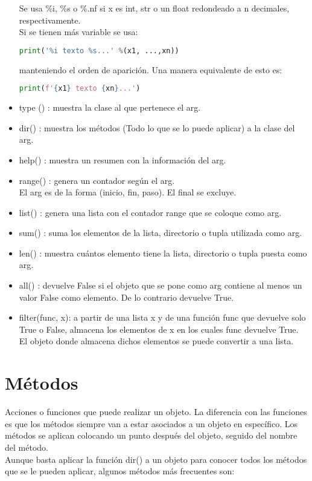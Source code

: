 \documentclass[10pt,oneside]{article}
\begin{document}
\begin{multicols}{2}
\begin{itemize}
                Se usa \%i, \%s o \%.nf si x es int, str o un float redondeado a n decimales, respectivamente.\\ \newline Si se tienen más variable se usa:
                
                \begin{lstlisting}[language=Python]
print('%i texto %s...' %(x1, ...,xn))   
                \end{lstlisting}
                
                manteniendo el orden de aparición. Una manera equivalente de esto es:

                \begin{lstlisting}[language=Python]
print(f'{x1} texto {xn}...')   
                \end{lstlisting}
                
                \item type () : muestra la clase al que pertenece el arg.
                \item dir() : muestra los métodos (Todo lo que se lo puede aplicar) a la clase del arg.
                \item help() : muestra un resumen con la información del arg.
                \item range() : genera un contador según el arg. \\ \newline * El arg es de la forma (inicio, fin, paso). El final se excluye.
                \item list() : genera una lista con el contador range que se coloque como arg.
                \item sum() : suma los elementos de la lista, directorio o tupla utilizada como arg.
                \item len() : muestra cuántos elemento tiene la lista, directorio o tupla puesta como arg.
                \item all() : devuelve False si el objeto que se pone como arg contiene al menos un valor False como elemento. De lo contrario devuelve True.  
                \item filter(func, x): a partir de una lista x y de una función func que devuelve solo True o False, almacena los elementos de x en los cuales func devuelve True. El objeto donde almacena dichos elementos se puede convertir a una lista.
            \end{itemize}

        \section{Métodos} 
            Acciones o funciones que puede realizar un objeto. La diferencia con las funciones es que los métodos siempre van a estar asociados a un objeto en específico. Los métodos se aplican colocando un punto después del objeto, seguido del nombre del método.\\ \newline Aunque basta aplicar la función dir() a un objeto para conocer todos los métodos que se le pueden aplicar, algunos métodos más frecuentes son: 
    

\end{multicols}
\end{document}
